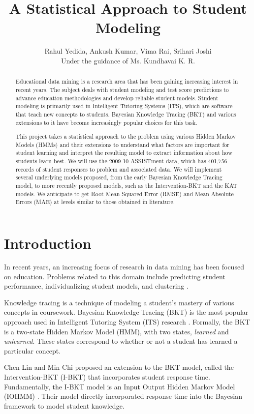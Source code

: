 \documentclass[12pt,a4paper]{article}
\title{A Statistical Approach to Student Modeling}
\author{Rahul Yedida, Ankush Kumar, Vima Rai, Srihari Joshi \\
	Under the guidance of Ms. Kundhavai K. R.}
\date{}
\begin{document}
\maketitle

\begin{abstract}
Educational data mining is a research area that has been gaining increasing interest in recent years. The subject deals with student modeling and test score predictions to advance education methodologies and develop reliable student models. Student modeling is primarily used in Intelligent Tutoring Systems (ITS), which are software that teach new concepts to students. Bayesian Knowledge Tracing (BKT) and various extensions to it have become increasingly popular choices for this task. \par
This project takes a statistical approach to the problem using various Hidden Markov Models (HMMs) and their extensions to understand what factors are important for student learning and interpret the resulting model to extract information about how students learn best. We will use the 2009-10 ASSISTment data, which has 401,756 records of student responses to problem and associated data. We will implement several underlying models proposed, from the early Bayesian Knowledge Tracing model, to more recently proposed models, such as the Intervention-BKT and the KAT models. We anticipate to get Root Mean Squared Error (RMSE) and Mean Absolute Errors (MAE) at levels similar to those obtained in literature.
\end{abstract}

\section{Introduction}
In recent years, an increasing focus of research in data mining has been focused on education. Problems related to this domain include predicting student performance, individualizing student models, and clustering \cite{assistmentsdata}. 

Knowledge tracing is a technique of modeling a student's mastery of various concepts in coursework. Bayesian Knowledge Tracing (BKT) \cite{corbett1994knowledge} is the most popular approach used in Intelligent Tutoring System (ITS) research \cite{d2008more}. Formally, the BKT is a two-state Hidden Markov Model (HMM), with two states, \textit{learned} and \textit{unlearned}. These states correspond to whether or not a student has learned a particular concept.

Chen Lin and Min Chi proposed an extension to the BKT model, called the Intervention-BKT (I-BKT) \cite{lin2016intervention} that incorporates student response time. Fundamentally, the I-BKT model is an Input Output Hidden Markov Model (IOHMM) \cite{chiappa2003hmm}. Their model directly incorporated response time into the Bayesian framework to model student knowledge.
\end{document}
